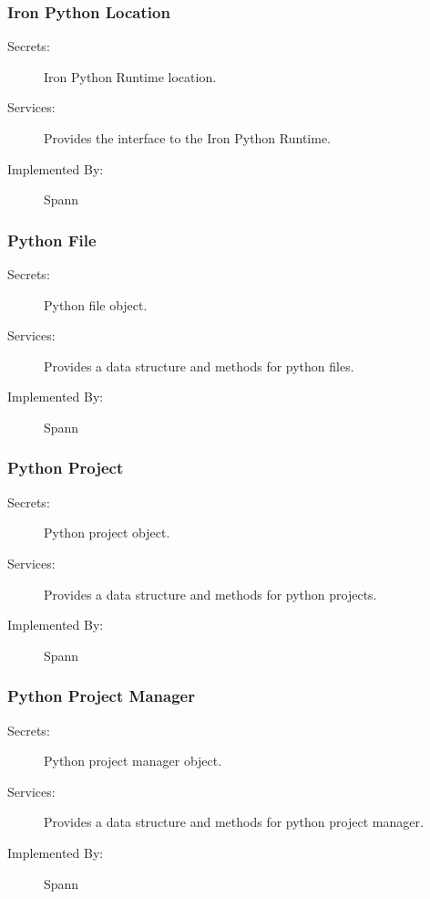 \documentclass[12pt, titlepage]{article}
\begin{document}
\subsubsection{Iron Python Location}

\begin{description}
\item[Secrets:] Iron Python Runtime location.
\item[Services:] Provides the interface to the Iron Python Runtime.
\item[Implemented By:] Spann
\end{description}

\subsubsection{Python File}

\begin{description}
\item[Secrets:] Python file object.
\item[Services:] Provides a data structure and methods for python files.
\item[Implemented By:] Spann
\end{description}

\subsubsection{Python Project}

\begin{description}
\item[Secrets:] Python project object.
\item[Services:] Provides a data structure and methods for python projects.
\item[Implemented By:] Spann
\end{description}

\subsubsection{Python Project Manager}

\begin{description}
\item[Secrets:] Python project manager object.
\item[Services:] Provides a data structure and methods for python project manager.
\item[Implemented By:] Spann
\end{description}
\end{document}
